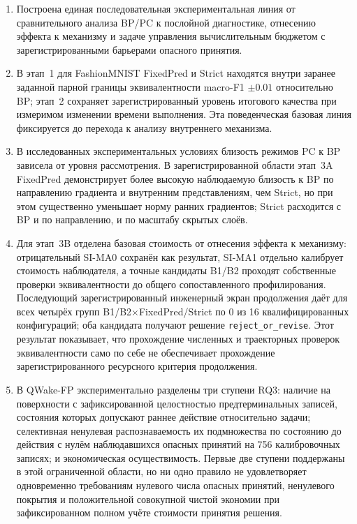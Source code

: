 \begin{enumerate}
  \item Построена единая последовательная экспериментальная линия от
  сравнительного анализа BP/PC к послойной диагностике, отнесению эффекта к
  механизму и задаче управления вычислительным бюджетом с зарегистрированными
  барьерами опасного принятия.

  \item В этап~1 для FashionMNIST FixedPred и Strict находятся внутри заранее
  заданной парной границы эквивалентности macro-F1 \(\pm 0.01\) относительно BP;
  этап~2 сохраняет зарегистрированный уровень итогового качества при измеримом
  изменении времени выполнения. Эта поведенческая базовая линия фиксируется до
  перехода к анализу внутреннего механизма.

  \item В исследованных экспериментальных условиях близость режимов PC к BP
  зависела от уровня рассмотрения. В зарегистрированной области этап~3A
  FixedPred демонстрирует более высокую наблюдаемую близость к BP по направлению
  градиента и внутренним представлениям, чем Strict, но при этом существенно
  уменьшает норму ранних градиентов; Strict расходится с BP и по направлению, и
  по масштабу скрытых слоёв.

  \item Для этап~3B отделена базовая стоимость от отнесения эффекта к
  механизму: отрицательный SI-MA0 сохранён как результат, SI-MA1 отдельно
  калибрует стоимость наблюдателя, а точные кандидаты B1/B2 проходят собственные
  проверки эквивалентности до общего сопоставленного профилирования. Последующий
  зарегистрированный инженерный экран продолжения даёт для всех четырёх групп
  B1/B2×FixedPred/Strict по 0 из 16 квалифицированных конфигураций; оба кандидата
  получают решение \texttt{reject\_or\_revise}. Этот результат показывает, что
  прохождение численных и траекторных проверок эквивалентности само по себе не
  обеспечивает прохождение зарегистрированного ресурсного критерия продолжения.

  \item В QWake-FP экспериментально разделены три ступени RQ3: наличие на
  поверхности с зафиксированной целостностью предтерминальных записей, состояния
  которых допускают раннее действие относительно задачи; селективная ненулевая
  распознаваемость их подмножества по
  состоянию до действия с нулём наблюдавшихся опасных принятий на 756
  калибровочных записях; и экономическая осуществимость. Первые две ступени
  поддержаны в этой ограниченной области, но ни одно правило не удовлетворяет
  одновременно требованиям нулевого числа опасных принятий, ненулевого покрытия
  и положительной совокупной чистой экономии при зафиксированном полном учёте
  стоимости принятия решения.


\end{enumerate}
